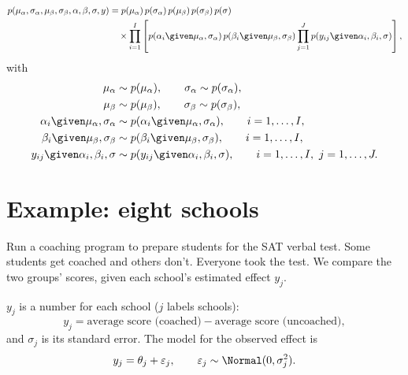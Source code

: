\begin{align*}
p(\mu_\alpha, \sigma_\alpha, \mu_\beta, \sigma_\beta, \alpha, \beta, \sigma, y)
&= p(\mu_\alpha)\,p(\sigma_\alpha)\,p(\mu_\beta)\,p(\sigma_\beta)\,p(\sigma) \\
&\quad\times \prod_{i=1}^{I}\left[p(\alpha_i \given \mu_\alpha, \sigma_\alpha)\,p(\beta_i \given \mu_\beta, \sigma_\beta)\prod_{j=1}^{J}p(y_{ij} \given \alpha_i, \beta_i, \sigma)\right],
\end{align*}
with
\begin{align*}
\mu_\alpha &\sim p(\mu_\alpha), \qquad \sigma_\alpha \sim p(\sigma_\alpha), \\
\mu_\beta &\sim p(\mu_\beta), \qquad \sigma_\beta \sim p(\sigma_\beta), \\
\alpha_i \given \mu_\alpha, \sigma_\alpha &\sim p(\alpha_i \given \mu_\alpha, \sigma_\alpha), \qquad i = 1, \dots, I, \\
\beta_i \given \mu_\beta, \sigma_\beta &\sim p(\beta_i \given \mu_\beta, \sigma_\beta), \qquad i = 1, \dots, I, \\
y_{ij} \given \alpha_i, \beta_i, \sigma &\sim p(y_{ij} \given \alpha_i, \beta_i, \sigma), \qquad i = 1, \dots, I,\ j = 1, \dots, J.
\end{align*}

\section{Example: eight schools}
Run a coaching program to prepare students for the SAT verbal test. Some students get coached and others don't. Everyone took the test. We compare the two groups' scores, given each school's estimated effect $y_j$.

$y_j$ is a number for each school ($j$ labels schools):
\[
y_j = \text{average score (coached)} - \text{average score (uncoached)},
\]
and $\sigma_j$ is its standard error. The model for the observed effect is
\[
y_j = \theta_j + \varepsilon_j, \qquad \varepsilon_j \sim \Normal(0, \sigma_j^2).
\]

\begin{center}
\end{center}

